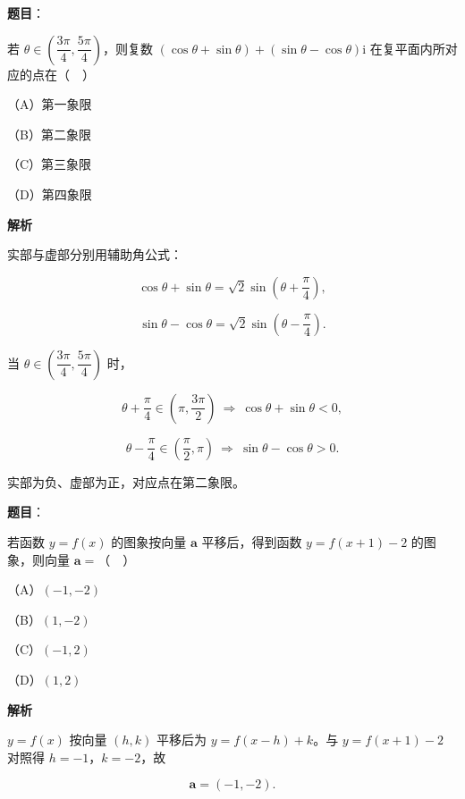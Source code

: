 \begin{answer}

\textbf{题目}：

若 $\theta\in\left(\dfrac{3\pi}{4},\dfrac{5\pi}{4}\right)$，则复数 $(\cos\theta+\sin\theta)+(\sin\theta-\cos\theta)\mathrm i$ 在复平面内所对应的点在（　）

（A）第一象限

（B）第二象限

（C）第三象限

（D）第四象限

\textbf{解析}

实部与虚部分别用辅助角公式：

\nopagebreak[4]
\[\cos\theta+\sin\theta=\sqrt2\sin\left(\theta+\frac{\pi}{4}\right),\]

\nopagebreak[4]
\[\sin\theta-\cos\theta=\sqrt2\sin\left(\theta-\frac{\pi}{4}\right).\]

当 $\theta\in\left(\dfrac{3\pi}{4},\dfrac{5\pi}{4}\right)$ 时，

\nopagebreak[4]
\[\theta+\frac{\pi}{4}\in\left(\pi,\frac{3\pi}{2}\right)\ \Rightarrow\ \cos\theta+\sin\theta<0,\]

\nopagebreak[4]
\[\theta-\frac{\pi}{4}\in\left(\frac{\pi}{2},\pi\right)\ \Rightarrow\ \sin\theta-\cos\theta>0.\]

实部为负、虚部为正，对应点在第二象限。


\end{answer}
\begin{answer}

\textbf{题目}：

若函数 $y=f(x)$ 的图象按向量 $\boldsymbol a$ 平移后，得到函数 $y=f(x+1)-2$ 的图象，则向量 $\boldsymbol a=$（　）

（A）$(-1,-2)$

（B）$(1,-2)$

（C）$(-1,2)$

（D）$(1,2)$

\textbf{解析}

$y=f(x)$ 按向量 $(h,k)$ 平移后为 $y=f(x-h)+k$。与 $y=f(x+1)-2$ 对照得 $h=-1$，$k=-2$，故

\nopagebreak[4]
\[\boldsymbol a=(-1,-2).\]


\end{answer}
